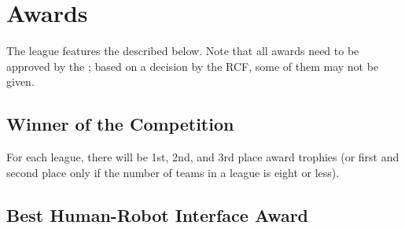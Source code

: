 \section{Awards}
\label{sec:awards}

The \AtHome{} league features the  described below.
Note that all awards need to be approved by the \RCF; based on a decision by the RCF, some of them may not be given.

\subsection{Winner of the Competition}
\label{award:winner}

For each league, there will be 1st, 2nd, and 3rd place award trophies (or first and second place only if the number of teams in a league is eight or less).

%
%
%
%


%
%
\subsection{Best Human-Robot Interface Award}
\label{award:hri}

